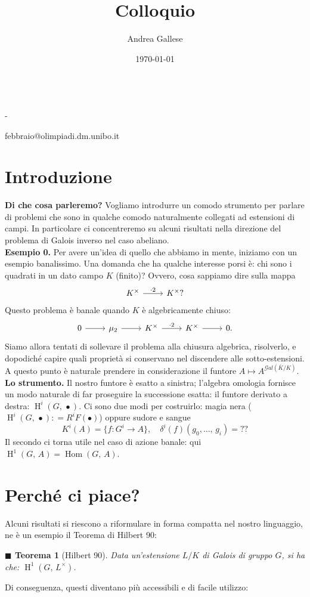 \documentclass[a4paper]{article}
\title{Colloquio}\let\Title\@title
\author{Andrea Gallese}\let\Author\@author
\date{\today}\let\Date\@date
\newcommand{\Intitola}{\begin{center}
		\vspace*{0,5 cm}
		{\Huge \textsc{\Title}} \\
		\vspace{0,5 cm}
		\texttt{\Author} \hspace{0.5cm} - \hspace{0.5cm} \texttt{\Date}
		\thispagestyle{empty}
		\vspace{0,7 cm}
\end{center}}
\newtheorem{theorem}{$ \blacksquare $ Teorema}
\theoremstyle{remark}
\theoremstyle{definition}
\newcommand{\Gal}[1]{\mathcal{G}al\left( #1 \right)}
\DeclareMathOperator{\Hom}{Hom}
\DeclareMathOperator{\HH}{H}
\begin{document}
\Intitola
\small

febbraio@olimpiadi.dm.unibo.it\\

\section*{Introduzione}

\textbf{Di che cosa parleremo?} Vogliamo introdurre un comodo strumento per parlare di problemi che sono in qualche comodo naturalmente collegati ad estensioni di campi. In particolare ci concentreremo su alcuni risultati nella direzione del problema di Galois inverso nel caso abeliano. \\

\textbf{Esempio 0.} Per avere un'idea di quello che abbiamo in mente, iniziamo con un esempio banalissimo. Una domanda che ha qualche interesse porsi è: chi sono i quadrati in un dato campo $ K $ (finito)? Ovvero, cosa sappiamo dire sulla mappa
\[ \begin{tikzcd}
K^\times \rar["\cdot 2"] & K^\times?
\end{tikzcd} \]
Questo problema è banale quando $ K $ è algebricamente chiuso:
\[ \begin{tikzcd}
0 \rar & \mu_2 \rar & K^\times \rar["\cdot 2"] & K^\times \rar & 0.
\end{tikzcd} \]
Siamo allora tentati di sollevare il problema alla chiusura algebrica, risolverlo, e dopodiché capire quali proprietà si conservano nel discendere alle sotto-estensioni. A questo punto è naturale prendere in considerazione il funtore $ A \mapsto A^{\Gal{\bar{K}/K}} $. \\

\textbf{Lo strumento.} Il nostro funtore è esatto a sinistra; l'algebra omologia fornisce un modo naturale di far proseguire la successione esatta: il funtore derivato a destra: $ \HH^i(G, \, \bullet) $. Ci sono due modi per costruirlo: magia nera ($ \HH^i(G, \, \bullet) \colon = R^iF(\bullet) $) oppure sudore e sangue
\[ K^i(A) = \{ f \colon G^i \to A \}, \quad \delta^i(f) (g_0, \dots, \, g_i) = ?? \]
Il secondo ci torna utile nel caso di azione banale: qui $ \HH^1(G, \, A) = \Hom(G, \, A) $. \\

\section*{Perché ci piace?}

Alcuni risultati si riescono a riformulare in forma compatta nel nostro linguaggio, ne è un esempio il Teorema di Hilbert 90:
\begin{theorem}[Hilbert 90]
	Data un'estensione $ L/K $ di Galois di gruppo $ G $, si ha che: $ \HH^1(G, \, L^\times) $.
\end{theorem}
Di conseguenza, questi diventano più accessibili e di facile utilizzo:
\end{document}
